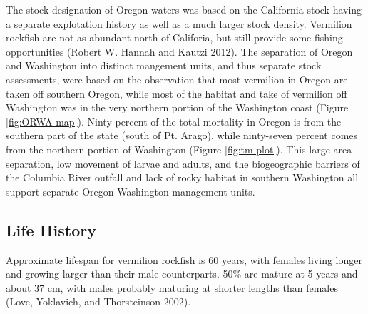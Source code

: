 \documentclass[11pt,
  english,
  a4paper,
]{article}
\begin{document}
The stock designation of Oregon waters was based on the California stock having a separate explotation history as well as a much larger stock density. Vermilion rockfish are not as abundant north of Califoria, but still provide some fishing opportunities {(Robert W. Hannah and Kautzi 2012)\leavevmode\tagmcend\tagstructend}. The separation of Oregon and Washington into distinct mangement units, and thus separate stock assessments, were based on the observation that most vermilion in Oregon are taken off southern Oregon, while most of the habitat and take of vermilion off Washington was in the very northern portion of the Washington coast (Figure \ref{fig:ORWA-map}). Ninty percent of the total mortality in Oregon is from the southern part of the state (south of Pt. Arago), while ninty-seven percent comes from the northern portion of Washington (Figure \ref{fig:tm-plot}). This large area separation, low movement of larvae and adults, and the biogeographic barriers of the Columbia River outfall and lack of rocky habitat in southern Washington all support separate Oregon-Washington management units.

\leavevmode\tagmcend\tagstructend\par


\hypertarget{life-history}{%
\subsection{Life History}\label{life-history}}

\leavevmode\tagmcend\tagstructend


Approximate lifespan for vermilion rockfish is 60 years, with females living longer and growing larger than their male counterparts. 50\% are mature at 5 years and about 37 cm, with males probably maturing at shorter lengths than females {(Love, Yoklavich, and Thorsteinson 2002)\leavevmode\tagmcend\tagstructend}.

\leavevmode\tagmcend\tagstructend\par

\end{document}
